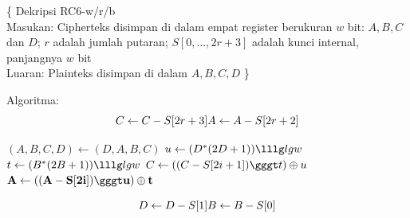 \documentclass{article}
\begin{document}

\{ Dekripsi RC6-w/r/b \\
Masukan: Cipherteks disimpan di dalam empat register berukuran $w$ bit: $A, B, C$ dan $D$; $r$ adalah jumlah putaran; $S[0, \dots, 2r+3]$ adalah kunci internal, panjangnya $w$ bit \\
Luaran: Plainteks disimpan di dalam $A, B, C, D$
\}

Algoritma:\
\[ C \leftarrow C - S[2r+3] \\
A \leftarrow A - S[2r+2] \]

\begin{algorithmic}
\State $(A, B, C, D) \leftarrow (D, A, B, C)$
\State $u \leftarrow (D^*(2D + 1)) \lllg lg w$
\State $t \leftarrow (B^*(2B + 1)) \lllg lg w$
\State $C \leftarrow ((C - S[2i + 1]) \gggt t) \oplus u$
\State $\mathbf{A \leftarrow ((A - S[2i]) \gggt u) \oplus t}$
\EndFor
\end{algorithmic}
\[ D \leftarrow D - S[1] \\
B \leftarrow B - S[0] \]
\end{document}
